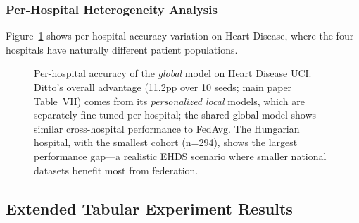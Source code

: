 \documentclass[conference]{IEEEtran}
\begin{document}
\subsubsection{Per-Hospital Heterogeneity Analysis}

Figure~\ref{fig:per_hospital} shows per-hospital accuracy variation on Heart Disease, where the four hospitals have naturally different patient populations.

\begin{figure}[htbp]
\centering
{}
\caption{Per-hospital accuracy of the \textit{global} model on Heart Disease UCI. Ditto's overall advantage (11.2pp over 10 seeds; main paper Table~VII) comes from its \textit{personalized local} models, which are separately fine-tuned per hospital; the shared global model shows similar cross-hospital performance to FedAvg. The Hungarian hospital, with the smallest cohort (n=294), shows the largest performance gap---a realistic EHDS scenario where smaller national datasets benefit most from federation.}
\label{fig:per_hospital}
\end{figure}


\subsection{Extended Tabular Experiment Results}
\label{sec:extended_tabular}
\end{document}
